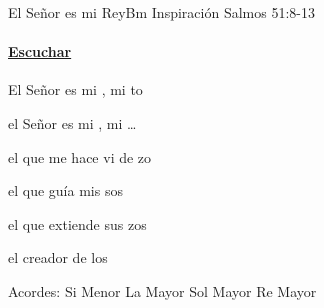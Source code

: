 \documentclass[12pt, spanish]{book}
\begin{document}
    \begin{song}{El Señor es mi Rey}{Bm}
    {} %
    {Inspiración}
    {Salmos 51:8-13} %
    {}
        \ifChordBk
        \paragraph{\mbox{}\hfill\protect\href{https://open.spotify.com/intl-es/track/7Azhuk7zD1duTn4VzjzbNO}{Escuchar}\mbox{}\hfill}
        \fi

        \begin{SBOpGroup}
            El Señor es mi , mi to

            el Señor es mi , mi \ldots

            el que me hace vi de zo

            el que guía mis sos

            el que extiende sus zos

            el creador de los 
        \end{SBOpGroup}


        \ifChordBk
        \begin{SBOpGroup}
            Acordes:\break
            \upchord{\Bm}\qquad Si Menor \hfill
            \upchord{\A}\qquad La Mayor \hfill\null\break
            \upchord{\G}\qquad Sol Mayor \hfill
            \upchord{\D}\qquad Re Mayor \hfill\null\break
        \end{SBOpGroup}
        \fi
    \end{song}
\end{document}
